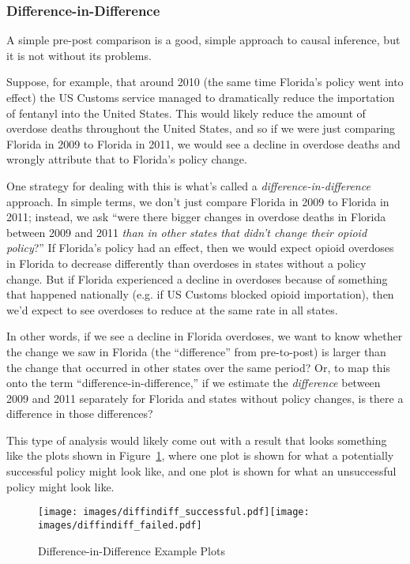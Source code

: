 \documentclass[12pt]{article}
\begin{document}
\subsubsection*{Difference-in-Difference}

A simple pre-post comparison is a good, simple approach to causal inference, but it is not without its problems.

Suppose, for example, that around 2010 (the same time Florida's policy went into effect) the US Customs service managed to dramatically reduce the importation of fentanyl into the United States. This would likely reduce the amount of overdose deaths throughout the United States, and so if we were just comparing Florida in 2009 to Florida in 2011, we would see a decline in overdose deaths and wrongly attribute that to Florida's policy change.

One strategy for dealing with this is what's called a \emph{difference-in-difference} approach. In simple terms, we don't just compare Florida in 2009 to Florida in 2011; instead, we ask ``were there bigger changes in overdose deaths in Florida between 2009 and 2011 \emph{than in other states that didn't change their opioid policy}?'' If Florida's policy had an effect, then we would expect opioid overdoses in Florida to decrease differently than overdoses in states without a policy change. But if Florida experienced a decline in overdoses because of something that happened nationally (e.g. if US Customs blocked opioid importation), then we'd expect to see overdoses to reduce at the same rate in all states.

In other words, if we see a decline in Florida overdoses, we want to know whether the change we saw in Florida (the ``difference'' from pre-to-post) is larger than the change that occurred in other states over the same period? Or, to map this onto the term ``difference-in-difference,'' if we estimate the \emph{difference} between 2009 and 2011 separately for Florida and states without policy changes, is there a difference in those differences?

This type of analysis would likely come out with a result that looks something like the plots shown in Figure~\ref{figure_diffindiff_examples}, where one plot is shown for what a potentially successful policy might look like, and one plot is shown for what an unsuccessful policy might look like.

\begin{figure}[h!]
  \centering
  \caption{Difference-in-Difference Example Plots}\label{figure_diffindiff_examples}
  \texttt{[image: images/diffindiff\_successful.pdf]}\texttt{[image: images/diffindiff\_failed.pdf]}
\end{figure}
\end{document}
